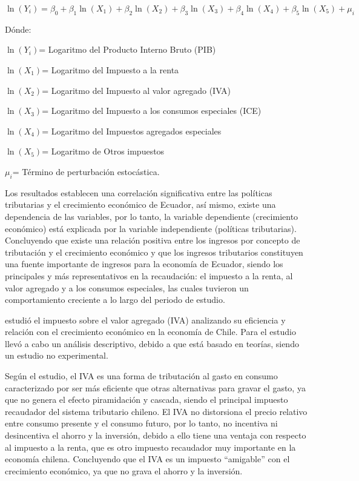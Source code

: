 \documentclass[
  letterpaper,
  DIV=11,
  numbers=noendperiod]{scrartcl}
\begin{document}
\(\ln(Y_i) = \beta_{0} + \beta_{1}\ln(X_1) + \beta_{2}\ln(X_2) + \beta_{3}\ln(X_3) + \beta_{4}\ln(X_4) + \beta_{5}\ln(X_5) + \mu_{i}\)

Dónde:

\(\ln(Y_i)\)= Logaritmo del Producto Interno Bruto (PIB)

\(\ln(X_1)\)= Logaritmo del Impuesto a la renta

\(\ln(X_2)\)= Logaritmo del Impuesto al valor agregado (IVA)

\(\ln(X_3)\)= Logaritmo del Impuesto a los consumos especiales (ICE)

\(\ln(X_4)\)= Logaritmo del Impuestos agregados especiales

\(\ln(X_5)\)= Logaritmo de Otros impuestos

\(\mu_{i}\)= Término de perturbación estocástica.

Los resultados establecen una correlación significativa entre las
políticas tributarias y el crecimiento económico de Ecuador, así mismo,
existe una dependencia de las variables, por lo tanto, la variable
dependiente (crecimiento económico) está explicada por la variable
independiente (políticas tributarias). Concluyendo que existe una
relación positiva entre los ingresos por concepto de tributación y el
crecimiento económico y que los ingresos tributarios constituyen una
fuente importante de ingresos para la economía de Ecuador, siendo los
principales y más representativos en la recaudación: el impuesto a la
renta, al valor agregado y a los consumos especiales, las cuales
tuvieron un comportamiento creciente a lo largo del periodo de estudio.

\textcite{henriquez_impuesto_2014} estudió el impuesto sobre el valor
agregado (IVA) analizando su eficiencia y relación con el crecimiento
económico en la economía de Chile. Para el estudio llevó a cabo un
análisis descriptivo, debido a que está basado en teorías, siendo un
estudio no experimental.

Según el estudio, el IVA es una forma de tributación al gasto en consumo
caracterizado por ser más eficiente que otras alternativas para gravar
el gasto, ya que no genera el efecto piramidación y cascada, siendo el
principal impuesto recaudador del sistema tributario chileno. El IVA no
distorsiona el precio relativo entre consumo presente y el consumo
futuro, por lo tanto, no incentiva ni desincentiva el ahorro y la
inversión, debido a ello tiene una ventaja con respecto al impuesto a la
renta, que es otro impuesto recaudador muy importante en la economía
chilena. Concluyendo que el IVA es un impuesto ``amigable'' con el
crecimiento económico, ya que no grava el ahorro y la inversión.
\end{document}
